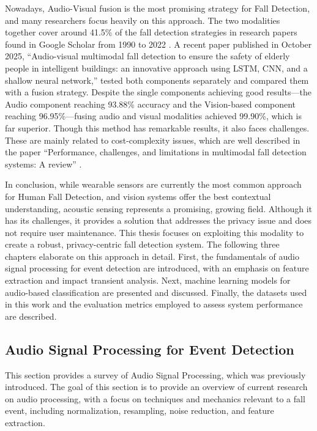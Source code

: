 \documentclass[11pt, a4paper, twoside]{article}
\begin{document}
Nowadays, Audio-Visual fusion is the most promising strategy for Fall Detection, and many researchers focus heavily on this approach. The two modalities together cover around 41.5\% of the fall detection strategies in research papers found in Google Scholar from 1990 to 2022 \cite{newaz2023methods}. A recent paper published in October 2025, ``Audio-visual multimodal fall detection to ensure the safety of elderly people in intelligent buildings: an innovative approach using LSTM, CNN, and a shallow neural network,'' tested both components separately and compared them with a fusion strategy. Despite the single components achieving good results—the Audio component reaching 93.88\% accuracy and the Vision-based component reaching 96.95\%—fusing audio and visual modalities achieved 99.90\%, which is far superior. Though this method has remarkable results, it also faces challenges. These are mainly related to cost-complexity issues, which are well described in the paper ``Performance, challenges, and limitations in multimodal fall detection systems: A review'' \cite{9459770}.
\newline

In conclusion, while wearable sensors are currently the most common approach for Human Fall Detection, and vision systems offer the best contextual understanding, acoustic sensing represents a promising, growing field. Although it has its challenges, it provides a solution that addresses the privacy issue and does not require user maintenance. This thesis focuses on exploiting this modality to create a robust, privacy-centric fall detection system. The following three chapters elaborate on this approach in detail. First, the fundamentals of audio signal processing for event detection are introduced, with an emphasis on feature extraction and impact transient analysis. Next, machine learning models for audio-based classification are presented and discussed. Finally, the datasets used in this work and the evaluation metrics employed to assess system performance are described.

\subsection{Audio Signal Processing for Event Detection}
\label{audio}
This section provides a survey of Audio Signal Processing, which was previously introduced. The goal of this section is to provide an overview of current research on audio processing, with a focus on techniques and mechanics relevant to a fall event, including normalization, resampling, noise reduction, and feature extraction.
\end{document}
